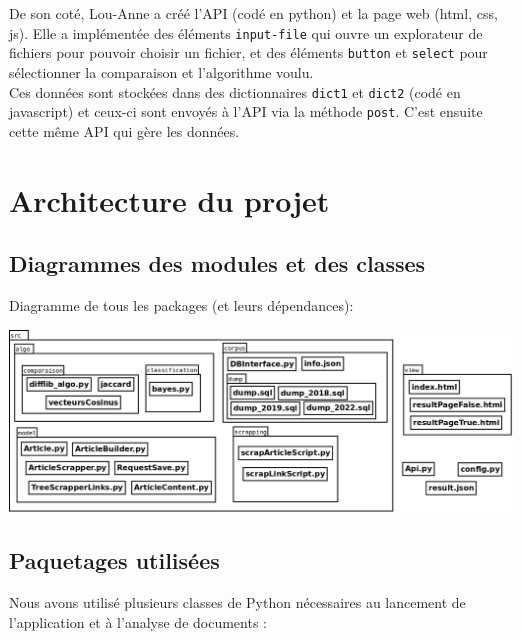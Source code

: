 \documentclass[french,12pt]{article}
\begin{document}
De son coté, Lou-Anne a créé l'API (codé en python) et la page web (html, css, js). Elle a implémentée des éléments \texttt{input-file} qui ouvre un explorateur de fichiers pour pouvoir choisir un fichier, et des éléments \texttt{button} et \texttt{select} pour sélectionner la comparaison et l'algorithme voulu. \\
Ces données sont stockées dans des dictionnaires \texttt{dict1} et \texttt{dict2} (codé en javascript) et ceux-ci sont envoyés à l'API via la méthode \texttt{post}. C'est ensuite cette même API qui gère les données.

\section{Architecture du projet} \label{architecture}

\subsection{Diagrammes des modules et des classes}

Diagramme de tous les packages (et leurs dépendances):

\begin{center}
	\includegraphics[scale=0.3]{img/DiagrammeClasse.png}	
\end{center}


\subsection{Paquetages utilisées}

Nous avons utilisé plusieurs classes de Python nécessaires au lancement de l'application et à l'analyse de documents :
\end{document}
